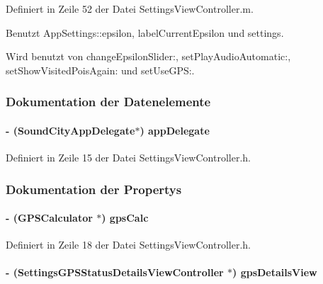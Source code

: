 Definiert in Zeile 52 der Datei SettingsViewController.m.

Benutzt AppSettings::epsilon, labelCurrentEpsilon und settings.

Wird benutzt von changeEpsilonSlider:, setPlayAudioAutomatic:, setShowVisitedPoisAgain: und setUseGPS:.

\subsubsection{Dokumentation der Datenelemente}
\hypertarget{interface_settings_view_controller_a55c58e84759317a7d8940b947f6eee99}{
\paragraph[{appDelegate}]{\setlength{\rightskip}{0pt plus 5cm}-\/ ({\bf SoundCityAppDelegate}$\ast$) {\bf appDelegate}}\hfill}
\label{interface_settings_view_controller_a55c58e84759317a7d8940b947f6eee99}


Definiert in Zeile 15 der Datei SettingsViewController.h.

\subsubsection{Dokumentation der Propertys}
\hypertarget{interface_settings_view_controller_a949fc1f1af89aa0e25d5c141bc70bd97}{
\paragraph[{gpsCalc}]{\setlength{\rightskip}{0pt plus 5cm}-\/ ({\bf GPSCalculator} $\ast$) gpsCalc}\hfill}
\label{interface_settings_view_controller_a949fc1f1af89aa0e25d5c141bc70bd97}


Definiert in Zeile 18 der Datei SettingsViewController.h.\hypertarget{interface_settings_view_controller_a2fee453249f10e0ebe7c4912960d60ec}{
\paragraph[{gpsDetailsView}]{\setlength{\rightskip}{0pt plus 5cm}-\/ ({\bf SettingsGPSStatusDetailsViewController} $\ast$) gpsDetailsView}\hfill}
\label{interface_settings_view_controller_a2fee453249f10e0ebe7c4912960d60ec}


